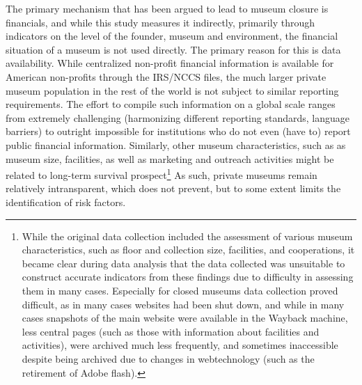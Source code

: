 \documentclass[12pt]{article}
\begin{document}
The primary mechanism that has been argued to lead to museum closure is financials, and while this study measures it indirectly, primarily through indicators on the level of the founder, museum and environment, the financial situation of a museum is not used directly.
The primary reason for this is data availability.
While centralized non-profit financial information is available for American non-profits through the IRS/NCCS files, the much larger private museum population in the rest of the world is not subject to similar reporting requirements.
The effort to compile such information on a global scale ranges from extremely challenging (harmonizing different reporting standards, language barriers) to outright impossible for institutions who do not even (have to) report public financial information.
Similarly, other museum characteristics, such as as museum size, facilities, as well as marketing and outreach activities might be related to long-term survival prospect\footnote{While the original data collection included the assessment of various museum characteristics, such as floor and collection size, facilities, and cooperations, it became clear during data analysis that the data collected was unsuitable to construct accurate indicators from these findings due to difficulty in assessing them in many cases.
Especially for closed museums data collection proved difficult, as in many cases websites had been shut down, and while in many cases snapshots of the main website were available in the Wayback machine, less central pages (such as those with information about facilities and activities), were archived much less frequently, and sometimes inaccessible despite being archived due to changes in webtechnology (such as the retirement of Adobe flash).}
As such, private museums remain relatively intransparent, which does not prevent, but to some extent limits the identification of risk factors. 
\end{document}
